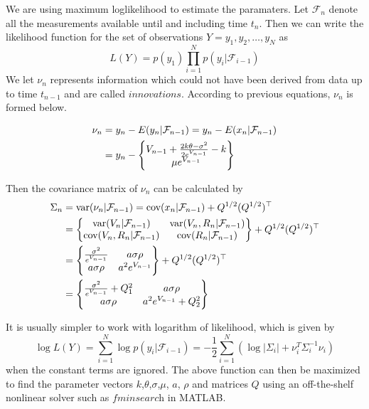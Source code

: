 \documentclass{amsart}
\numberwithin{equation}{section}
\begin{document}
We are using maximum loglikelihood to estimate the paramaters. Let $\mathcal F_{n}$ denote all the measurements available until and including time $t_{n}$. Then we can write the likelihood function for the set of observations $Y = {y_{1},y_{2},\dots, y_{N}}$ as 
$$
L(Y) = p(y_{1})\prod_{i=1}^{N}p(y_{i}|\mathcal F_{i-1})
$$
We let $\nu_{n}$ represents information which could not have been derived from data up to time $t_{n-1}$ and are called $\textit{innovations}$. According to previous equations, $\nu_{n}$ is formed below.

\begin{align}
\nu_{n}&=y_{n}-E(y_{n}|\mathcal F_{n-1})
=y_{n}-E(x_{n}|\mathcal F_{n-1})  \notag \\
&=y_{n}-\left\{
\begin{matrix}
   V_{n-1}+\frac{2k\theta-\sigma^{2}}{2e^{V_{n-1}}}-k\\
   \mu e^{V_{n-1}}
\end{matrix}
\right\}
\end{align}
 


Then the covariance matrix of $\nu_{n}$ can be calculated by
%
%
\begin{align}
\Sigma_{n}&=\textup{var}(\nu_{n}|\mathcal F_{n-1})
=\textup{cov}(x_{n}|\mathcal F_{n-1})+Q^{1/2}(Q^{1/2})^{\top}\notag\\
&=\left\{
\begin{matrix}
\textup{var}(V_{n}|\mathcal F_{n-1}) & \textup{var}(V_{n},R_{n}|\mathcal F_{n-1})  \notag \\
\textup{cov}(V_{n},R_{n}|\mathcal F_{n-1}) & \textup{cov}(R_{n}|\mathcal F_{n-1})
\end{matrix}
\right\}+Q^{1/2}(Q^{1/2})^{\top}\notag\\
&=\left\{
\begin{matrix}
\frac{\sigma^{2}}{e^{V_{n-1}}} & a\sigma \rho  \notag\\
a\sigma \rho & a^{2}e^{V_{n-1}}
\end{matrix}
\right\}+Q^{1/2}(Q^{1/2})^{\top}\\
&=\left\{
\begin{matrix}
\frac{\sigma^{2}}{e^{V_{n-1}}}+Q_{1}^2 & a\sigma \rho\\
a\sigma \rho & a^{2}e^{V_{n-1}}+Q_{2}^2
\end{matrix}
\right \}
\end{align}
 


It is usually simpler to work with logarithm of likelihood, which is given by 
$$
\log L(Y) = \sum_{i=1}^{N}\log p(y_{i}|\mathcal F_{i-1})=-\frac{1}{2}\sum_{i=1}^{N}(\log|\Sigma_{i}|+\nu_{i}^{T} \Sigma_{i}^{-1}\nu_{i})
$$
when the constant terms are ignored. The above function can then be maximized to find the parameter vectors $k$,$\theta$,$\sigma$,$\mu$, $a$, $\rho$ and matrices $Q$ using an off-the-shelf nonlinear solver such as $\textit{fminsearch}$ in MATLAB. 
\end{document}
